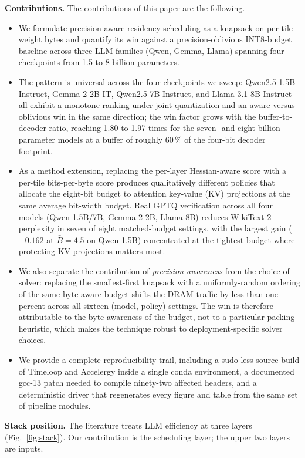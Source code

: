 \documentclass{ieeeaccess}
\begin{document}
\noindent\textbf{Contributions.} The contributions of this paper are
the following.
\begin{itemize}
\item We formulate precision-aware residency scheduling as a knapsack
on per-tile weight bytes and quantify its win against a
precision-oblivious INT8-budget baseline across three LLM families
(Qwen, Gemma, Llama) spanning four checkpoints from 1.5 to 8 billion
parameters.
\item The pattern is universal across the four checkpoints we sweep:
Qwen2.5-1.5B-Instruct, Gemma-2-2B-IT, Qwen2.5-7B-Instruct, and
Llama-3.1-8B-Instruct all exhibit a monotone ranking under joint
quantization and an aware-versus-oblivious win in the same direction;
the win factor grows with the buffer-to-decoder ratio, reaching 1.80
to 1.97 times for the seven- and eight-billion-parameter models at a
buffer of roughly 60\,\% of the four-bit decoder footprint.
\item As a method extension, replacing the per-layer Hessian-aware
score with a per-tile bits-per-byte score produces qualitatively
different policies that allocate the eight-bit budget to attention
key-value (KV) projections at the same average bit-width budget.
Real GPTQ verification across all four models (Qwen-1.5B/7B,
Gemma-2-2B, Llama-8B) reduces WikiText-2 perplexity in seven of eight
matched-budget settings, with the largest gain ($-0.162$ at
$\bar B\!=\!4.5$ on Qwen-1.5B) concentrated at the tightest budget
where protecting KV projections matters most.
\item We also separate the contribution of \emph{precision awareness}
from the choice of solver: replacing the smallest-first knapsack with
a uniformly-random ordering of the same byte-aware budget shifts the
DRAM traffic by less than one percent across all sixteen
(model, policy) settings. The win is therefore attributable to the
byte-awareness of the budget, not to a particular packing heuristic,
which makes the technique robust to deployment-specific solver
choices.
\item We provide a complete reproducibility trail, including a
sudo-less source build of Timeloop and Accelergy inside a single
conda environment, a documented gcc-13 patch needed to compile
ninety-two affected headers, and a deterministic driver that
regenerates every figure and table from the same set of pipeline
modules.
\end{itemize}

\noindent\textbf{Stack position.} The literature treats LLM efficiency
at three layers (Fig.~\ref{fig:stack}). Our contribution is the
scheduling layer; the upper two layers are inputs.
\end{document}
